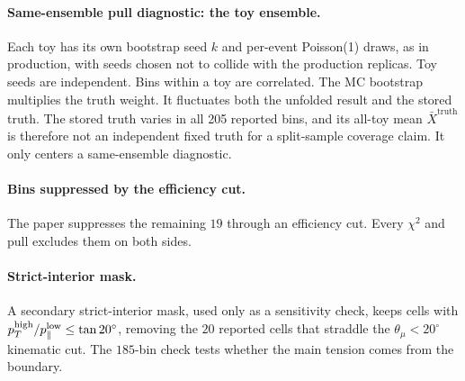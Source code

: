 \paragraph{Same-ensemble pull diagnostic: the toy ensemble.} Each toy has its own bootstrap seed $k$ and per-event Poisson(1) draws, as in production, with seeds chosen not to collide with the production replicas. Toy seeds are independent. Bins within a toy are correlated. The MC bootstrap multiplies the truth weight. It fluctuates both the unfolded result and the stored truth. The stored truth varies in all 205 reported bins, and its all-toy mean $\bar X^{\text{truth}}$ is therefore not an independent fixed truth for a split-sample coverage claim. It only centers a same-ensemble diagnostic.

\paragraph{Bins suppressed by the efficiency cut.} The paper suppresses the remaining $19$ through an efficiency cut. Every $\chi^{2}$ and pull excludes them on both sides.

\paragraph{Strict-interior mask.} A secondary strict-interior mask, used only as a sensitivity check, keeps cells with $p_{T}^{\text{high}} / p_{\parallel}^{\text{low}} \le \tan 20^{\circ}$, removing the $20$ reported cells that straddle the $\theta_{\mu}<20^{\circ}$ kinematic cut. The $185$-bin check tests whether the main tension comes from the boundary.

